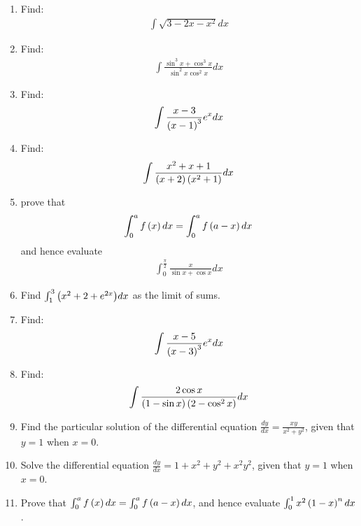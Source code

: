 \begin{enumerate}
\item Find: \begin{align*}\int\sqrt{3-2x-x^2}dx\end{align*}

\item Find: \begin{align*}\int{\frac{\sin^3{x}+\cos^3{x}}{\sin^2{x}\cos^2{x}}}dx\end{align*}

\item Find: \begin{align*}\int{\frac{x-3}{\ensuremath{\left(x-1\right)}^3}}e^x 
dx\end{align*}

\item Find: \begin{align*}\int{\frac{x^2+x+1}{\ensuremath{\left(x+2\right)}\ensuremath{\left(x^2+1\right)}}}dx\end{align*}

\item prove that 
\begin{align*}
    \int_{0}^{a} f\left(x\right)dx = \int_{0}^{a} f\left(a-x\right)dx
\end{align*}
and hence evaluate 
\begin{align*}
\int_{0}^{\frac{\pi}{2}}\frac{x}{{\sin x}+{\cos x}}dx
\end{align*}

\item Find $\int_{1}^{3}{\left(x^2+2+e^{2x}\right)}dx$ as the limit of sums.
        

         \item Find: 
 \begin{align*}
 \int{\frac{x-5}{\ensuremath{\left(x-3\right)}^3}}e^x dx
 \end{align*}

\item Find: 
\begin{align*}
\int{\frac{2\cos x}{\ensuremath{\left(1-\sin x\right)}\ensuremath{\left(2-\cos^2 x\right)}}}dx
\end{align*}  

\item Find the particular solution of the differential equation $\frac{d y}{d x}=\frac{xy}{x^{2}+y^{2}}$, given that $y = 1$ when $x = 0$.

\item Solve the differential equation $\frac{dy} {dx} =1+x^{2}+y^{2}+x^{2}y^{2}$, given that $y = 1$ when $x = 0$.

\item Prove that $\int_{0}^{a} f \left(x\right)d x = \int_{0}^{a} f\left(a-x\right) d x$, and hence evaluate  $\int_{0}^{1} x^{2}\left(1-x\right)^{n}dx$ .
\end{enumerate} 
